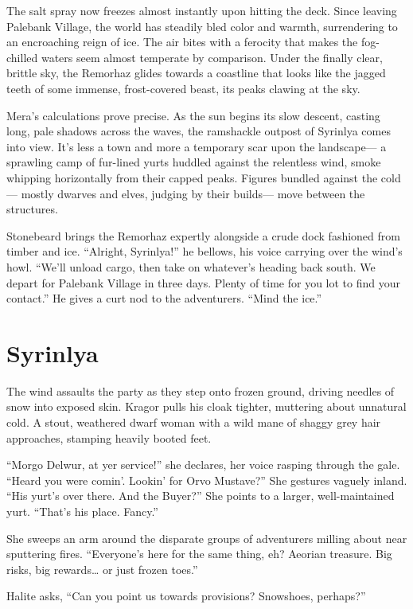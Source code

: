 \documentclass[
  letterpaper,12pt,twoside,twocolumn,openany,
  nodeprecatedcode,bg=full]{dndbook}
\begin{document}
The salt spray now freezes almost instantly upon hitting the deck. Since
leaving Palebank Village, the world has steadily bled color and warmth,
surrendering to an encroaching reign of ice. The air bites with a
ferocity that makes the fog-chilled waters seem almost temperate by
comparison. Under the finally clear, brittle sky, the Remorhaz glides
towards a coastline that looks like the jagged teeth of some immense,
frost-covered beast, its peaks clawing at the sky.

Mera's calculations prove precise. As the sun begins its slow descent,
casting long, pale shadows across the waves, the ramshackle outpost of
Syrinlya comes into view. It's less a town and more a temporary scar
upon the landscape--- a sprawling camp of fur-lined yurts huddled
against the relentless wind, smoke whipping horizontally from their
capped peaks. Figures bundled against the cold--- mostly dwarves and
elves, judging by their builds--- move between the structures.

Stonebeard brings the Remorhaz expertly alongside a crude dock fashioned
from timber and ice. ``Alright, Syrinlya!'' he bellows, his voice
carrying over the wind's howl. ``We'll unload cargo, then take on
whatever's heading back south. We depart for Palebank Village in three
days. Plenty of time for you lot to find your contact.'' He gives a curt
nod to the adventurers. ``Mind the ice.''

\section{Syrinlya}\label{syrinlya}

The wind assaults the party as they step onto frozen ground, driving
needles of snow into exposed skin. Kragor pulls his cloak tighter,
muttering about unnatural cold. A stout, weathered dwarf woman with a
wild mane of shaggy grey hair approaches, stamping heavily booted feet.

``Morgo Delwur, at yer service!'' she declares, her voice rasping
through the gale. ``Heard you were comin'. Lookin' for Orvo Mustave?''
She gestures vaguely inland. ``His yurt's over there. And the Buyer?''
She points to a larger, well-maintained yurt. ``That's his place.
Fancy.''

She sweeps an arm around the disparate groups of adventurers milling
about near sputtering fires. ``Everyone's here for the same thing, eh?
Aeorian treasure. Big risks, big rewards\ldots{} or just frozen toes.''

Halite asks, ``Can you point us towards provisions? Snowshoes,
perhaps?''
\end{document}
